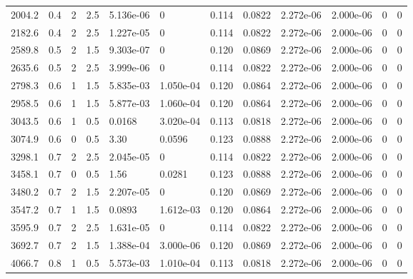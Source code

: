 \documentclass[preview]{standalone}
\begin{document}
{{\begin{tabular}{L{1.2cm}C{1.2cm} C{0.3cm}C{0.5cm} C{1.4cm}C{1.4cm} C{1.4cm}C{1.4cm} C{1.6cm}C{1.6cm} C{1.6cm}C{1.6cm}}
  2004.2  &   0.4  & 2     & 2.5 &  5.136e-06  & 0  &  0.114&   0.0822& 2.272e-06 & 2.000e-06   &  0 & 0  \\ 
  2182.6  &   0.4  & 2     & 2.5 &  1.227e-05  & 0  &  0.114&   0.0822& 2.272e-06 & 2.000e-06   &  0 & 0  \\ 
  2589.8  &   0.5  & 2     & 1.5 &  9.303e-07  & 0  &  0.120&   0.0869& 2.272e-06 & 2.000e-06   &  0 & 0  \\ 
  2635.6  &   0.5  & 2     & 2.5 &  3.999e-06  & 0  &  0.114&   0.0822& 2.272e-06 & 2.000e-06   &  0 & 0  \\ 
  2798.3  &   0.6  & 1     & 1.5 &  5.835e-03  & 1.050e-04  &  0.120&   0.0864& 2.272e-06 & 2.000e-06   &  0 & 0  \\ 
  2958.5  &   0.6  & 1     & 1.5 &  5.877e-03  & 1.060e-04  &  0.120&   0.0864& 2.272e-06 & 2.000e-06   &  0 & 0  \\ 
  3043.5  &   0.6  & 1     & 0.5 &  0.0168  & 3.020e-04  &  0.113&   0.0818& 2.272e-06 & 2.000e-06   &  0 & 0  \\ 
  3074.9  &   0.6  & 0     & 0.5 &  3.30  & 0.0596  &  0.123&   0.0888& 2.272e-06 & 2.000e-06   &  0 & 0  \\ 
  3298.1  &   0.7  & 2     & 2.5 &  2.045e-05  & 0  &  0.114&   0.0822& 2.272e-06 & 2.000e-06   &  0 & 0  \\ 
  3458.1  &   0.7  & 0     & 0.5 &  1.56  & 0.0281  &  0.123&   0.0888& 2.272e-06 & 2.000e-06   &  0 & 0  \\ 
  3480.2  &   0.7  & 2     & 1.5 &  2.207e-05  & 0  &  0.120&   0.0869& 2.272e-06 & 2.000e-06   &  0 & 0  \\ 
  3547.2  &   0.7  & 1     & 1.5 &  0.0893  & 1.612e-03  &  0.120&   0.0864& 2.272e-06 & 2.000e-06   &  0 & 0  \\ 
  3595.9  &   0.7  & 2     & 2.5 &  1.631e-05  & 0  &  0.114&   0.0822& 2.272e-06 & 2.000e-06   &  0 & 0  \\ 
  3692.7  &   0.7  & 2     & 1.5 &  1.388e-04  & 3.000e-06  &  0.120&   0.0869& 2.272e-06 & 2.000e-06   &  0 & 0  \\ 
  4066.7  &   0.8  & 1     & 0.5 &  5.573e-03  & 1.010e-04  &  0.113&   0.0818& 2.272e-06 & 2.000e-06   &  0 & 0  \\ 
\hline 
\end{tabular} 

}}
\end{document}
